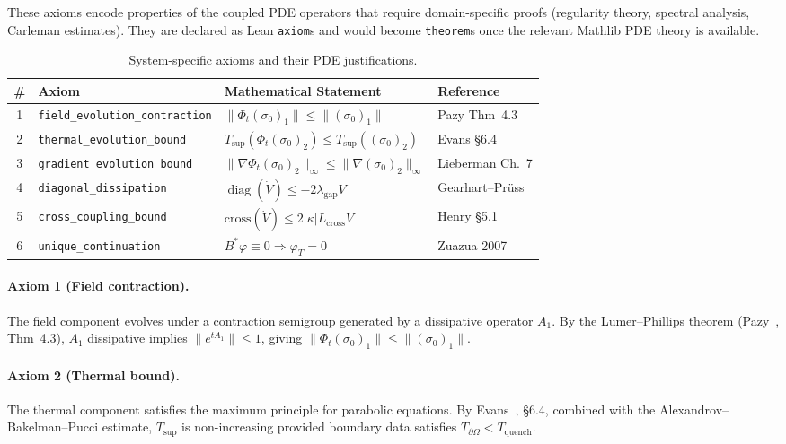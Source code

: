 \documentclass[11pt,a4paper]{article}
\theoremstyle{plain}
\theoremstyle{definition}
\theoremstyle{remark}
\newcommand{\norm}[1]{\lVert #1 \rVert}
\newcommand{\abs}[1]{\lvert #1 \rvert}
\newcommand{\kk}{\kappa}
\newcommand{\leaninline}[1]{\texttt{#1}}
\DeclareMathOperator{\diag}{diag}
\begin{document}
These axioms encode properties of the coupled PDE operators that require
domain-specific proofs (regularity theory, spectral analysis, Carleman
estimates).  They are declared as Lean \texttt{axiom}s and would become
\texttt{theorem}s once the relevant Mathlib PDE theory is available.

\begin{table}[ht]
\centering
\caption{System-specific axioms and their PDE justifications.}
\label{tab:sys-axioms}
\begin{tabularx}{\textwidth}{clXl}
\toprule
\# & Axiom & Mathematical Statement & Reference \\
\midrule
1 & \leaninline{field\_evolution\_contraction}
  & $\norm{\Phi_t(\sigma_0)_1} \le \norm{(\sigma_0)_1}$
  & Pazy Thm~4.3 \\
2 & \leaninline{thermal\_evolution\_bound}
  & $T_{\sup}(\Phi_t(\sigma_0)_2) \le T_{\sup}((\sigma_0)_2)$
  & Evans \S6.4 \\
3 & \leaninline{gradient\_evolution\_bound}
  & $\norm{\nabla \Phi_t(\sigma_0)_2}_\infty \le \norm{\nabla(\sigma_0)_2}_\infty$
  & Lieberman Ch.~7 \\
4 & \leaninline{diagonal\_dissipation}
  & $\diag(\dot{V}) \le -2\lambda_{\mathrm{gap}} V$
  & Gearhart--Pr\"{u}ss \\
5 & \leaninline{cross\_coupling\_bound}
  & $\mathrm{cross}(\dot{V}) \le 2\abs{\kk} L_{\mathrm{cross}} V$
  & Henry \S5.1 \\
6 & \leaninline{unique\_continuation}
  & $B^*\varphi \equiv 0 \Rightarrow \varphi_T = 0$
  & Zuazua 2007 \\
\bottomrule
\end{tabularx}
\end{table}

\paragraph{Axiom 1 (Field contraction).}
The field component evolves under a contraction semigroup generated by a
dissipative operator $A_1$.  By the Lumer--Phillips theorem
(Pazy~\cite{Pazy1983}, Thm~4.3), $A_1$ dissipative implies
$\norm{e^{tA_1}} \le 1$, giving $\norm{\Phi_t(\sigma_0)_1} \le
\norm{(\sigma_0)_1}$.

\paragraph{Axiom 2 (Thermal bound).}
The thermal component satisfies the maximum principle for parabolic
equations.  By Evans~\cite{Evans2010}, \S6.4, combined with the
Alexandrov--Bakelman--Pucci estimate, $T_{\sup}$ is non-increasing
provided boundary data satisfies $T_{\partial\Omega} < T_{\mathrm{quench}}$.
\end{document}
